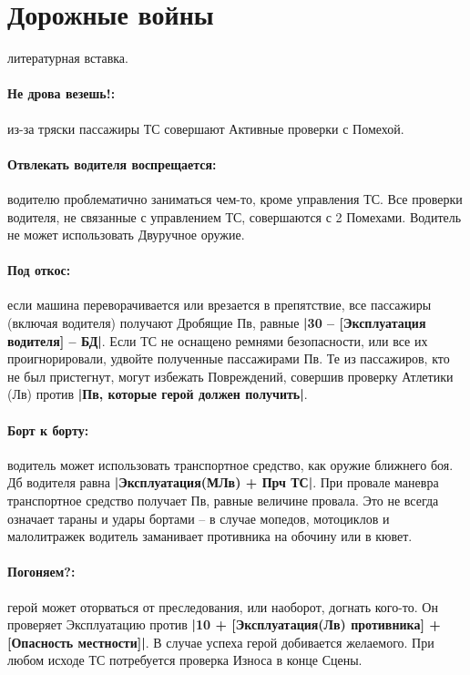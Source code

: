 \section{Дорожные войны}
\tbd литературная вставка.
\paragraph{Не дрова везешь!:} из-за тряски пассажиры ТС совершают Активные проверки с Помехой. 
\paragraph{Отвлекать водителя воспрещается:} водителю проблематично заниматься чем-то, кроме управления ТС. Все проверки водителя, не связанные с управлением ТС, совершаются с 2 Помехами. Водитель не может использовать Двуручное оружие.
\paragraph{Под откос:} если машина переворачивается или врезается в препятствие, все пассажиры (включая водителя) получают Дробящие Пв, равные \textbf{|30 – [Эксплуатация водителя] – БД|}. Если ТС не оснащено ремнями безопасности, или все их проигнорировали, удвойте полученные пассажирами Пв. 
\newline Те из пассажиров, кто не был пристегнут, могут избежать Повреждений, совершив проверку Атлетики (Лв) против \textbf{|Пв, которые герой должен получить|}.
\paragraph{Борт к борту:} водитель может использовать транспортное средство, как оружие ближнего боя. Дб водителя равна \textbf{|Эксплуатация(МЛв) + Прч ТС|}. При провале маневра транспортное средство получает Пв, равные величине провала. Это не всегда означает тараны и удары бортами – в случае мопедов, мотоциклов и малолитражек водитель заманивает противника на обочину или в кювет.
\paragraph{Погоняем?:} герой может оторваться от преследования, или наоборот, догнать кого-то. Он проверяет Эксплуатацию против \textbf{|10 + [Эксплуатация(Лв) противника] + [Опасность местности]|}. В случае успеха герой добивается желаемого. При любом исходе ТС потребуется проверка Износа в конце Сцены.
